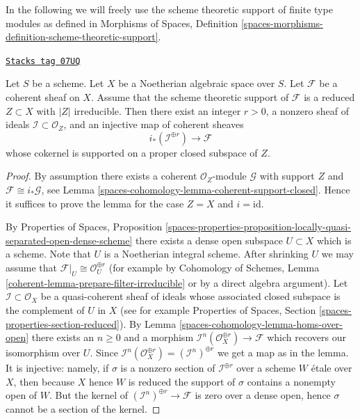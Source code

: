 In the following we will freely use the scheme theoretic support of
finite type modules as defined in Morphisms of Spaces, Definition
\ref{spaces-morphisms-definition-scheme-theoretic-support}.

\begin{lemma}
\label{spaces-cohomology-lemma-prepare-filter-irreducible}
\href{https://stacks.math.columbia.edu/tag/07UQ}{\texttt{Stacks tag 07UQ}}

Let $S$ be a scheme. Let $X$ be a Noetherian algebraic space over $S$.
Let $\mathcal{F}$ be a coherent sheaf on $X$. Assume that the scheme
theoretic support of $\mathcal{F}$ is a reduced $Z \subset X$ with
$|Z|$ irreducible. Then there exist an integer $r > 0$, a nonzero
sheaf of ideals $\mathcal{I} \subset \mathcal{O}_Z$, and an injective
map of coherent sheaves
$$
i_*\left(\mathcal{I}^{\oplus r}\right) \to \mathcal{F}
$$
whose cokernel is supported on a proper closed subspace of $Z$.
\end{lemma}

\begin{proof}
By assumption there exists a coherent $\mathcal{O}_Z$-module
$\mathcal{G}$ with support $Z$ and $\mathcal{F} \cong i_*\mathcal{G}$, see
Lemma \ref{spaces-cohomology-lemma-coherent-support-closed}. Hence it suffices to prove the
lemma for the case $Z = X$ and $i = \text{id}$.

\medskip\noindent
By Properties of Spaces, Proposition
\ref{spaces-properties-proposition-locally-quasi-separated-open-dense-scheme}
there exists a dense open subspace $U \subset X$ which is a scheme. Note that
$U$ is a Noetherian integral scheme. After shrinking $U$ we may assume
that $\mathcal{F}|_U \cong \mathcal{O}_U^{\oplus r}$ (for example by
Cohomology of Schemes, Lemma \ref{coherent-lemma-prepare-filter-irreducible}
or by a direct algebra argument). Let $\mathcal{I} \subset \mathcal{O}_X$
be a quasi-coherent sheaf of ideals whose associated closed subspace
is the complement of $U$ in $X$ (see for example
Properties of Spaces, Section \ref{spaces-properties-section-reduced}).
By Lemma \ref{spaces-cohomology-lemma-homs-over-open} there exists an $n \geq 0$ and a
morphism $\mathcal{I}^n(\mathcal{O}_X^{\oplus r}) \to \mathcal{F}$
which recovers our isomorphism over $U$. Since
$\mathcal{I}^n(\mathcal{O}_X^{\oplus r}) = (\mathcal{I}^n)^{\oplus r}$
we get a map as in the lemma. It is injective: namely, if $\sigma$ is
a nonzero section of $\mathcal{I}^{\oplus r}$ over a scheme $W$ \'etale
over $X$, then because $X$ hence $W$ is reduced the support of $\sigma$
contains a nonempty open of $W$. But the kernel of
$(\mathcal{I}^n)^{\oplus r} \to \mathcal{F}$ is zero
over a dense open, hence $\sigma$ cannot be a section of the kernel.
\end{proof}

